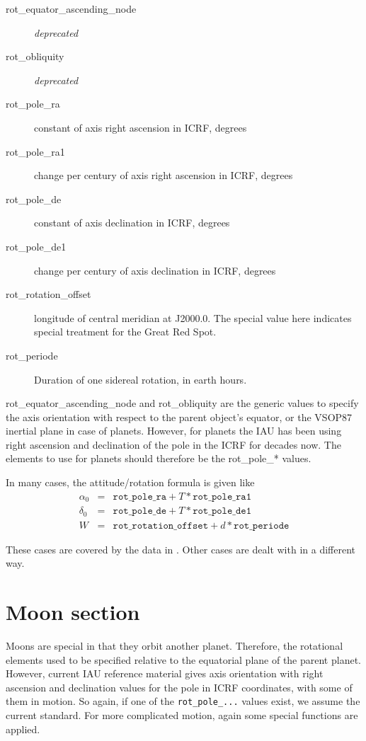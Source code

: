\begin{description}
\item[rot\_equator\_ascending\_node] \emph{deprecated}
\item[rot\_obliquity] \emph{deprecated}
\item[rot\_pole\_ra]  constant of axis right ascension in ICRF, degrees
\item[rot\_pole\_ra1] change per century of axis right ascension in ICRF, degrees
\item[rot\_pole\_de] constant of axis declination in ICRF, degrees
\item[rot\_pole\_de1] change per century of axis declination in ICRF, degrees
\item[rot\_rotation\_offset] longitude of central meridian at J2000.0. 
                             The special value here indicates special treatment for the Great Red Spot.
\item[rot\_periode] Duration of one sidereal rotation, in earth hours.
\end{description}

rot\_equator\_ascending\_node and rot\_obliquity are the generic
values to specify the axis orientation with respect to the parent
object's equator, or the VSOP87 inertial plane in case of planets. However,
for planets the IAU has been using right ascension and declination of
the pole in the ICRF for decades now. The elements to use for planets
should therefore be the rot\_pole\_* values.

In many cases, the attitude/rotation formula is given like
\begin{eqnarray}
  \label{eq:PlanetOrientation}
  \alpha_0 &=& \mathtt{rot\_pole\_ra} + T * \mathtt{rot\_pole\_ra1}\\
  \delta_0 &=& \mathtt{rot\_pole\_de} + T * \mathtt{rot\_pole\_de1}\\
  W        &=& \mathtt{rot\_rotation\_offset} + d * \mathtt{rot\_periode}
\end{eqnarray}

These cases are covered by the data in . Other cases are dealt with in a different way.


\section{Moon section}
\label{sec:ssystem.ini:Moon}

Moons are special in that they orbit another planet. Therefore, the
rotational elements used to be specified relative to the equatorial plane of the
parent planet. However, current IAU reference material gives axis orientation
with right ascension and declination values for the pole in ICRF
coordinates, with some of them in motion. So again, if one of the
\texttt{rot\_pole\_...} values exist, we assume the current
standard. For more complicated motion, again some special functions
are applied.

